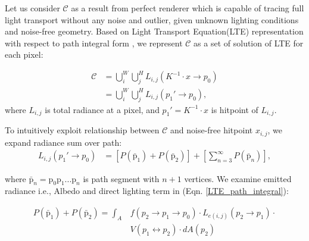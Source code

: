 Let us consider $\mathcal{C}$ as a result from perfect renderer which is capable of tracing full light transport without any noise and outlier, given unknown lighting conditions and noise-free geometry. 
Based on Light Transport Equation(LTE) representation with respect to path integral form \cite{veach1998robust}, we represent $\mathcal{C}$ as a set of solution of LTE for each pixel:

\begin{align}
    \mathcal{C} & = \bigcup_i^W \bigcup_j^H L_{i,j}\left(K^{-1}\cdot x\rightarrow p_0\right) \nonumber \\
    & = \bigcup_i^W \bigcup_j^H L_{i,j}\left(p_1'\rightarrow p_0\right),
\end{align}
where $L_{i,j}$ is total radiance at a pixel, and $p_1'=K^{-1}\cdot x$ is hitpoint of $L_{i,j}$.

To intuitively exploit relationship between $\mathcal{C}$ and noise-free hitpoint $x_{i,j}$, we expand radiance sum over path:
\begin{align}
    L_{i,j}\left(p_1'\rightarrow p_0\right)& = [\mathit{P\left(\bar{\mathrm{p}}_1\right)}+\mathit{P\left(\bar{\mathrm{p}}_2\right)}]+[\sum_{n=3}^\infty \mathit{P}\left(\bar{\mathrm{p}}_n\right)], 
    \label{LTE_path_integral}
\end{align}

where $\bar{\mathrm{p}}_n=\mathrm{p}_0\mathrm{p}_1...\mathrm{p}_n$ is path segment with $n+1$ vertices. We examine emitted radiance i.e., Albedo and direct lighting term in (Eqn. \ref{LTE_path_integral}):

\begin{align}
    \mathit{P\left(\bar{\mathrm{p}}_1\right)}+\mathit{P\left(\bar{\mathrm{p}}_2\right)}=\int_A & f\left(p_2\rightarrow p_1\rightarrow p_0\right)\cdot L_{e (i,j)}\left(p_2\rightarrow p_1\right)\cdot \nonumber \\
    & V\left(p_1 \leftrightarrow p_2\right) \cdot dA\left(p_2\right)
\end{align}


